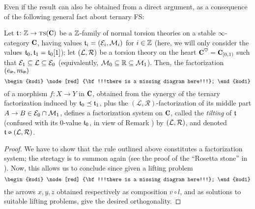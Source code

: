 \documentclass[a4paper,12pt]{amsart}
\renewcommand{\textbf}[1]{\text{\fontseries{b}\selectfont{\upshape #1}}}
\begin{document}
Even if the result can also be obtained from a direct argument, as a consequence of the following general fact about ternary FS:
\begin{lemma}\label{tilted.FS}
Let $\tee\colon \Z\to \ts(\C)$ be a $\mathbb{Z}$\hyp{}family of normal torsion theories on a stable $\infty$\hyp{}category $\C$, having values $\mathfrak{t}_i = (\mathcal{E}_i, \mathcal{M}_i)$ for $i\in\mathbb{Z}$ (here, we will only consider the values $\mathfrak{t}_0, \mathfrak{t}_1 = \mathfrak{t}_0[1]$); let $(\mathcal{L},\mathcal{R})$ be a torsion theory on the heart $\C^\heart = \C_{[0,1)}$ such that $\mathcal{E}_1\subseteq \mathcal{L} \subseteq \mathcal{E}_0$ (equivalently, $\mathcal{M}_0 \subseteq \mathbb{R} \subseteq \mathcal{M}_1$). Then, the factorization $(e_{\tilt},m_{\tilt})$
\[
\begin{kodi}
\node[red] {\bf !!!there is a missing diagram here!!!};
\end{kodi}
\]
of a morphism $f\colon X\to Y$ in $\C$, obtained from the synergy of the ternary factorization induced by $\mathfrak{t}_0 \preceq \mathfrak{t}_1$, plus the $(\mathcal{L},\mathcal{R})$\hyp{}factorization of its middle part $A\to B \in \mathcal{E}_0\cap \mathcal{M}_1$, defines a factorization system on $\C$, called the \emph{tilting} of $\mathfrak{t}$ (confused with its $0$\hyp{}value $\mathfrak{t}_0$, in view of Remark ) by $(\mathcal{L}, \mathcal{R})$, and denoted $\tee\tilt (\LL,\fR)$.
\end{lemma}
\begin{proof}
We have to show that the rule outlined above constitutes a factorization system; the stretagy is to summon \cite[\athm \textbf{A}]{Korostenski199357} again (see the proof of the ``Rosetta stone'' in \cite{Fiorenza2014}).%
Now, this allows us to conclude since given a lifting problem
\[
\begin{kodi}
\node[red] {\bf !!!there is a missing diagram here!!!};
\end{kodi}
\]
the arrows $x,y,z$ obtained respectively as composition $v\circ l$, and as solutions to suitable lifting problems, give the desired orthogonality.
\end{proof}
{}

\hrulefill 
\begin{center}
\end{center}
\end{document}
